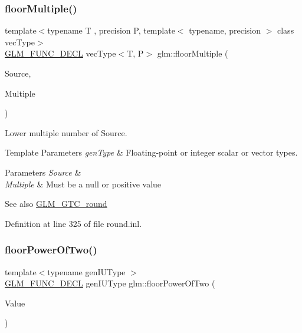 \subsubsection{\texorpdfstring{floorMultiple()}{floorMultiple()}\hspace{0.1cm}{\footnotesize\ttfamily [2/2]}}
{\footnotesize\ttfamily template$<$typename T , precision P, template$<$ typename, precision $>$ class vec\+Type$>$ \\
\mbox{\hyperlink{setup_8hpp_ab2d052de21a70539923e9bcbf6e83a51}{G\+L\+M\+\_\+\+F\+U\+N\+C\+\_\+\+D\+E\+CL}} vec\+Type$<$T, P$>$ glm\+::floor\+Multiple (\begin{DoxyParamCaption}\item[{vec\+Type$<$ T, P $>$ const \&}]{Source,  }\item[{vec\+Type$<$ T, P $>$ const \&}]{Multiple }\end{DoxyParamCaption})}

Lower multiple number of Source.


\begin{DoxyTemplParams}{Template Parameters}
{\em gen\+Type} & Floating-\/point or integer scalar or vector types. \\
\hline
\end{DoxyTemplParams}

\begin{DoxyParams}{Parameters}
{\em Source} & \\
\hline
{\em Multiple} & Must be a null or positive value\\
\hline
\end{DoxyParams}
\begin{DoxySeeAlso}{See also}
\mbox{\hyperlink{group__gtc__round}{G\+L\+M\+\_\+\+G\+T\+C\+\_\+round}} 
\end{DoxySeeAlso}


Definition at line 325 of file round.\+inl.

\mbox{\label{group__gtc__round_gac80f6519c31baae10d8d7bea6735d1fa}} 
\subsubsection{\texorpdfstring{floorPowerOfTwo()}{floorPowerOfTwo()}\hspace{0.1cm}{\footnotesize\ttfamily [1/2]}}
{\footnotesize\ttfamily template$<$typename gen\+I\+U\+Type $>$ \\
\mbox{\hyperlink{setup_8hpp_ab2d052de21a70539923e9bcbf6e83a51}{G\+L\+M\+\_\+\+F\+U\+N\+C\+\_\+\+D\+E\+CL}} gen\+I\+U\+Type glm\+::floor\+Power\+Of\+Two (\begin{DoxyParamCaption}\item[{gen\+I\+U\+Type}]{Value }\end{DoxyParamCaption})}

